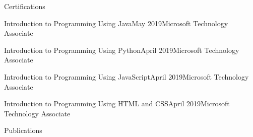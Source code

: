\documentclass{resume} %
\begin{document}
\begin{rSection}{Certifications}
\begin{rSubsection}{Introduction to Programming Using Java}{May 2019}{Microsoft Technology Associate}{}
\end{rSubsection}
\begin{rSubsection}{Introduction to Programming Using Python}{April 2019}{Microsoft Technology Associate}{}
\end{rSubsection}
\begin{rSubsection}{Introduction to Programming Using JavaScript}{April 2019}{Microsoft Technology Associate}{}
\end{rSubsection}
\begin{rSubsection}{Introduction to Programming Using HTML and CSS}{April 2019}{Microsoft Technology Associate}{}
\end{rSubsection}
\end{rSection}






\begin{rSection}{Publications}

\renewcommand\refname{\vskip -2em} %


\nocite{*}


\end{rSection}




\end{document}
